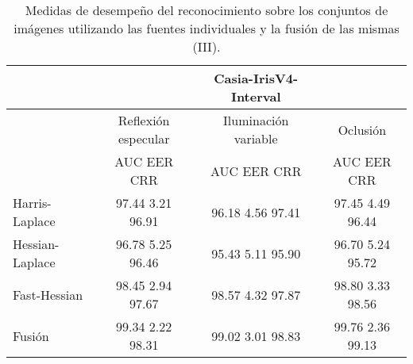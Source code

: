 \begin{table}[h]
\begin{center}
\begin{tabular}{@{}lccc@{}}
\toprule
&& Casia-IrisV4-Interval & \\ \hline
&Reflexión especular		&  	Iluminación variable		& Oclusión \\ \hline
&AUC  \phantom{aa} EER  \phantom{aa} CRR &  	AUC  \phantom{aa} EER  \phantom{aa} CRR		& AUC  \phantom{aa} EER  \phantom{aa} CRR \\ \hline
Harris-Laplace& 97.44 \phantom{aa} 3.21  \phantom{aa} 96.91 &  	96.18 \phantom{aa} 4.56  \phantom{aa}97.41		& 97.45 \phantom{aa} 4.49 \phantom{aa} 96.44 \\
Hessian-Laplace& 96.78 \phantom{aa} 5.25  \phantom{aa} 96.46 &  	95.43 \phantom{aa} 5.11 \phantom{aa} 95.90 & 96.70 \phantom{aa} 5.24 \phantom{aa} 95.72\\
Fast-Hessian& 98.45  \phantom{aa}2.94 \phantom{aa}  97.67 &  	98.57 \phantom{aa} 4.32 \phantom{aa}97.87		& 98.80  \phantom{aa}3.33 \phantom{aa} 98.56 \\
Fusión& 99.34 \phantom{aa} 2.22  \phantom{aa}98.31 &  	99.02  \phantom{aa}3.01 \phantom{aa} 98.83		& 99.76 \phantom{aa} 2.36  \phantom{aa}99.13 \\ \hline

\end{tabular}
\end{center}
\caption{Medidas de desempeño del reconocimiento sobre los conjuntos de imágenes utilizando las fuentes individuales y la fusión de las mismas (III).}
\label{my_tabla}
\end{table}

\newpage

